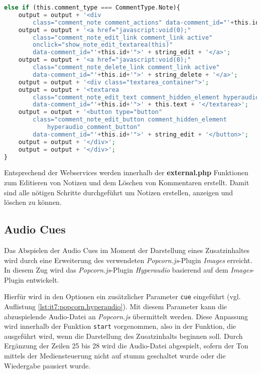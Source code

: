  
\begin{lstlisting}[language=php,
             linewidth=\textwidth,
             caption={Ausschnitt der \textbf{hyperaudio.js} in der 6. Iteration},
             label={lst:it6:hyperaudio}]
else if (this.comment_type === CommentType.Note){
    output = output + '<div
        class="comment_note comment_actions" data-comment_id="'+this.id+'">';
    output = output + '<a href="javascript:void(0);"
        class="comment_note_edit_link comment_link active"
        onclick="show_note_edit_textarea(this)"
        data-comment_id="'+this.id+'">' + string_edit + '</a>';
    output = output + '<a href="javascript:void(0);"
        class="comment_note_delete_link comment_link active"
        data-comment_id="'+this.id+'">' + string_delete + '</a>';
    output = output + '<div class="textarea_container">';
    output = output + '<textarea
        class="comment_note_edit_text comment_hidden_element hyperaudio_textarea"
        data-comment_id="'+this.id+'">' + this.text + '</textarea>';
    output = output + '<button type="button"
        class="comment_note_edit_button comment_hidden_element
            hyperaudio_comment_button"
        data-comment_id="'+this.id+'">' + string_edit + '</button>';
    output = output + '</div>';
    output = output + '</div>';
}		
\end{lstlisting}

Entsprechend der Webservices werden innerhalb der \textbf{external.php} Funktionen zum Editieren von Notizen und dem Löschen von Kommentaren erstellt. Damit sind alle nötigen Schritte durchgeführt um Notizen erstellen, anzeigen und löschen zu können.


\subsection{Audio Cues}
Das Abspielen der Audio Cues im Moment der Darstellung eines Zusatzinhaltes wird durch eine Erweiterung des verwendeten \textit{Popcorn.js}-Plugin \textit{Images} erreicht. In diesem Zug wird das \textit{Popcorn.js}-Plugin \textit{Hyperaudio} basierend auf dem \textit{Images}-Plugin entwickelt.

Hierfür wird in den Optionen ein zusätzlicher Parameter \texttt{cue} eingeführt (vgl. Auflistung \ref{lst:it7:popcorn.hyperaudio}). Mit diesem Parameter kann die abzuspielende Audio-Datei an \textit{Popcorn.js} übermittelt werden. Diese Anpassung wird innerhalb der Funktion \texttt{start} vorgenommen, also in der Funktion, die ausgeführt wird, wenn die Darstellung des Zusatzinhalts beginnen soll. Durch Ergänzung der Zeilen 25 bis 28 wird die Audio-Datei abgespielt, sofern der Ton mittels der Mediensteuerung nicht auf stumm geschaltet wurde oder die Wiedergabe pausiert wurde. 

